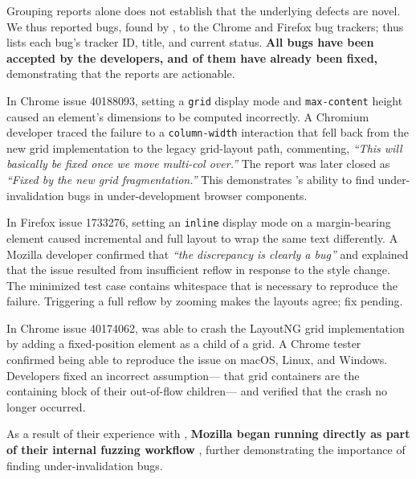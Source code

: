 Grouping reports alone does not establish that the underlying defects are novel.
We thus reported \NumBugsNovel{} bugs, found by \toolname,
  to the Chrome and Firefox bug trackers;
   thus lists each bug's
  tracker ID, title, and current status.
\textbf{
All \NumBugsNovel{} bugs have been accepted by the developers,
  and \NumBugsFixed{} of them have already been fixed,
}
  demonstrating that the reports are actionable.

In Chrome issue 40188093,
  setting a \texttt{grid} display mode and \texttt{max-content} height
  caused an element's dimensions to be computed incorrectly.
A Chromium developer traced the failure to
  a \texttt{column-width} interaction that fell back from
  the new grid implementation to the legacy grid-layout path, commenting,
  \textit{``This will basically be fixed once we move multi-col over.''}
The report was later closed as
  \textit{``Fixed by the new grid fragmentation.''}
This demonstrates \toolname's ability to find under-invalidation bugs
  in under-development browser components.

In Firefox issue 1733276,
  setting an \texttt{inline} display mode on a margin-bearing element
  caused incremental and full layout to wrap the same text differently.
A Mozilla developer confirmed that 
  \textit{``the discrepancy is clearly a bug''}
  and explained that the issue resulted from insufficient reflow
  in response to the style change.
The minimized test case contains whitespace
  that is necessary to reproduce the failure.
Triggering a full reflow by zooming makes the layouts agree; fix pending.

In Chrome issue 40174062,
  \toolname was able to crash the LayoutNG grid implementation
  by adding a fixed-position element as a child of a grid.
A Chrome tester confirmed being able to reproduce the issue
  on macOS, Linux, and Windows.
Developers fixed an incorrect assumption---%
  that grid containers are the containing block
  of their out-of-flow children---%
  and verified that the crash no longer occurred.

As a result of their experience with \toolname,
  \textbf{
    Mozilla began running \toolname directly
    as part of their internal fuzzing workflow
  },
  further demonstrating the importance
  of finding under-invalidation bugs.

